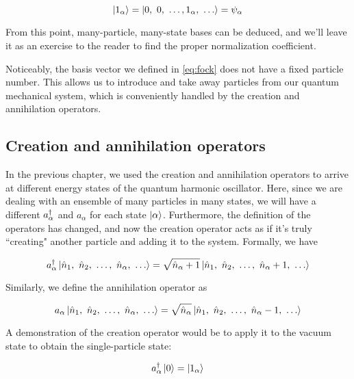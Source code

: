 \begin{equation}
	\ket{1_{\alpha}} = \ket{0,\ 0,\ \dots, 1_{\alpha},\ \dots} = \psi_{\alpha}
\end{equation}

From this point, many-particle, many-state bases can be deduced, and we'll leave it as an exercise to the reader to find the proper normalization coefficient.

Noticeably, the basis vector we defined in \autoref{eq:fock} does not have a fixed particle number. 
This allows us to introduce and take away particles from our quantum mechanical system, which is conveniently handled by the creation and annihilation operators.


\subsection{Creation and annihilation operators}

In the previous chapter, we used the creation and annihilation operators to arrive at different energy states of the quantum harmonic oscillator. 
Here, since we are dealing with an ensemble of many particles in many states, we will have a different $a^{\dagger}_{\alpha}$ and $a_{\alpha}$ for each state $\ket{\alpha}$. 
Furthermore, the definition of the operators has changed, and now the creation operator acts as if it's truly ``creating" another particle and adding it to the system. 
Formally, we have

\begin{equation}
	\ad_{\alpha} \ket{\hat{n}_1,\ \hat{n}_2,\ \dots,\ \hat{n}_{\alpha},\ \dots} = \sqrt{\hat{n}_{\alpha}+1}\ket{\hat{n}_1,\ \hat{n}_2,\ \dots,\ \hat{n}_{\alpha}+1,\ \dots}
\end{equation} 

Similarly, we define the annihilation operator as

\begin{equation}
a_{\alpha} \ket{\hat{n}_1,\ \hat{n}_2,\ \dots,\ \hat{n}_{\alpha},\ \dots} = \sqrt{\hat{n}_{\alpha}}\ket{\hat{n}_1,\ \hat{n}_2,\ \dots,\ \hat{n}_{\alpha}-1,\ \dots}
\end{equation} 

A demonstration of the creation operator would be to apply it to the vacuum state to obtain the single-particle state:

\begin{equation}
	a^{\dagger}_{\alpha} \ket{0} = \ket{1_{\alpha}}
\end{equation}

